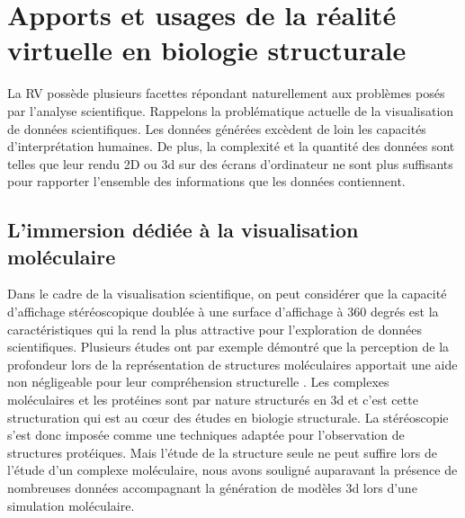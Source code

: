 \section{Apports et usages de la réalité virtuelle en biologie structurale} \label{RV_for_bio_struct}

La RV possède plusieurs facettes répondant naturellement aux problèmes posés par l'analyse scientifique. Rappelons la problématique actuelle de la visualisation de données scientifiques. Les données générées excèdent de loin les capacités d'interprétation humaines. De plus, la complexité et la quantité des données sont telles que leur rendu 2D ou 3d sur des écrans d'ordinateur ne sont plus suffisants pour rapporter l'ensemble des informations que les données contiennent. %

\subsection{L'immersion dédiée à la visualisation moléculaire}

Dans le cadre de la visualisation scientifique, on peut considérer que la capacité d'affichage stéréoscopique doublée à une surface d'affichage à 360 degrés est la caractéristiques qui la rend la plus attractive pour l'exploration de données scientifiques. Plusieurs études ont par exemple démontré que la perception de la profondeur lors de la représentation de structures moléculaires apportait une aide non négligeable pour leur compréhension structurelle \cite{van_dam_immersive_2000,stone_immersive_2010,odonoghue_visualization_2010}. Les complexes moléculaires et les protéines sont par nature structurés en 3d et c'est cette structuration qui est au cœur des études en biologie structurale. La stéréoscopie s'est donc imposée comme une techniques adaptée pour l'observation de structures protéiques. 
Mais l'étude de la structure seule ne peut suffire lors de l'étude d'un complexe moléculaire, nous avons souligné auparavant la présence de nombreuses données accompagnant la génération de modèles 3d lors d'une simulation moléculaire. 


